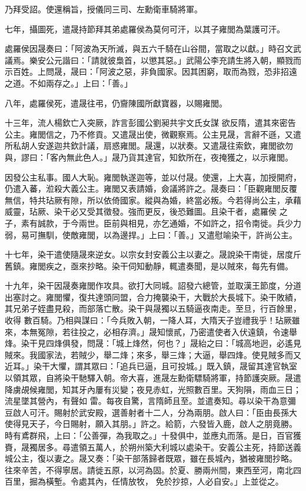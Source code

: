 \begin{pinyinscope}
 乃拜受詔。使還稱旨，授儀同三司、左勳衛車騎將軍。



 七年，攝圖死，遣晟持節拜其弟處羅侯為莫何可汗，以其子雍閭為葉護可汗。



 處羅侯因晟奏曰：「阿波為天所滅，與五六千騎在山谷間，當取之以獻。」時召文武議焉。樂安公元諧曰：「請就彼梟首，以懲其惡。」武陽公李充請生將入朝，顯戮而示百姓。上問晟，晟曰：「阿波之惡，非負國家。因其困窮，取而為戮，恐非招遠之道。不如兩存之。」上曰：「善。」



 八年，處羅侯死，遣晟往弔，仍齎陳國所獻寶器，以賜雍閭。



 十三年，流人楊欽亡入突厥，詐言彭國公劉昶共宇文氏女謀
 欲反隋，遣其來密告公主。雍閭信之，乃不修貢。又遣晟出使，微觀察焉。公主見晟，言辭不遜，又遣所私胡人安遂迦共欽計議，扇惑雍閭。晟還，以狀奏。又遣晟往索欽，雍閭欲勿與，謬曰：「客內無此色人。」晟乃貨其達官，知欽所在，夜掩獲之，以示雍閭。



 因發公主私事。國人大恥。雍閭執遂迦等，並以付晟。使還，上大喜，加授開府，仍遣入蕃，涖殺大義公主。雍閭又表請婚，僉議將許之。晟奏曰：「臣觀雍閭反覆無信，特共玷厥有隙，所以依倚國家。縱與為婚，終當必叛。今若得尚公主，承藉威靈，玷厥、染干必又受其徵發。強而更反，後恐難圖。且染干者，處羅侯
 之子，素有誠款，于今兩世。臣前與相見，亦乞通婚，不如許之，招令南徙。兵少力弱，易可撫馴，使敵雍閭，以為邊捍。」上曰：「善。」又遣慰喻染干，許尚公主。



 十七年，染干遣使隨晟來逆女。以宗女封安義公主以妻之。晟說染干南徙，居度斤舊鎮。雍閭疾之，亟來抄略。染干伺知動靜，輒遣奏聞，是以賊來，每先有備。



 十九年，染干因晟奏雍閭作攻具。欲打大同城。詔發六總管，並取漢王節度，分道出塞討之。雍閭懼，復共達頭同盟，合力掩襲染干，大戰於大長城下。染干敗績，其兄弟子姪盡見殺，而部落亡散。染干與晟獨以五騎逼夜南走。至旦，行百餘里，收得
 數百騎。乃相與謀曰：「今兵敗入朝，一降人耳，大隋天子豈禮我乎！玷厥雖來，本無冤隙，若往投之，必相存濟。」晟知懷貳，乃密遣使者入伏遠鎮，令速舉烽。染干見四烽俱發，問晟：「城上烽然，何也？」晟紿之曰：「城高地迥，必遙見賊來。我國家法，若賊少，舉二烽；來多，舉三烽；大逼，舉四烽。使見賊多而又近耳。」染干大懼，謂其眾曰：「追兵已逼，且可投城。」既入鎮，晟留其達官執室以領其眾，自將染干馳驛入朝。帝大喜，進晟左勳衛驃騎將軍，持節護突厥。晟遣降虜覘候雍閭，知其牙內屢有災變；夜見赤虹，光照數百里。天狗隕，雨血三日；流星墜其營內，有聲如
 雷。每夜自驚，言隋師且至。並遣奏知。尋以染干為意彌豆啟人可汗。賜射於武安殿，選善射者十二人，分為兩朋。啟人曰：「臣由長孫大使得見天子，今日賜射，願入其朋。」許之。給箭，六發皆入鹿，啟人之朋竟勝。時有鳶群飛，上曰：「公善彈，為我取之。」十發俱中，並應丸而落。是日，百官獲賚，晟獨居多。尋遣領五萬人，於朔州築大利城以處染干。安義公主死，持節送義城公主，復以妻之。晟又奏：「染干部落歸者既眾，雖在長城內，猶被雍閭抄略。往來辛苦，不得寧居。請徙五原，以河為固。於夏、勝兩州間，東西至河，南北四百里，掘為橫塹。令處其內，任情放牧，
 免於抄掠，人必自安。」上並從之。




\end{pinyinscope}
